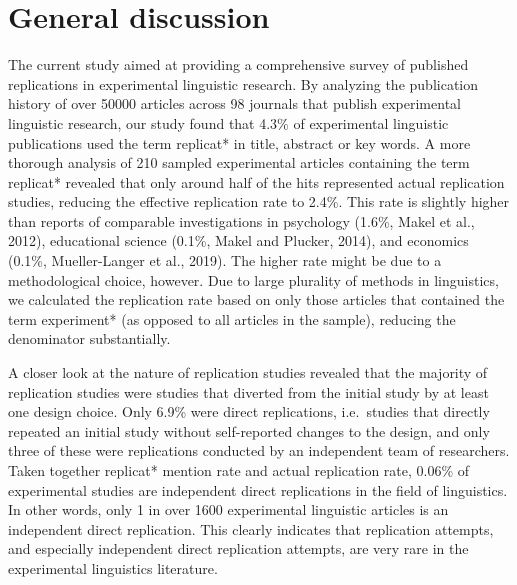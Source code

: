 \documentclass[]{elsarticle} %
\begin{document}
\hypertarget{general-discussion}{%
\section{General discussion}\label{general-discussion}}

The current study aimed at providing a comprehensive survey of published replications in experimental linguistic research.
By analyzing the publication history of over 50000 articles across 98 journals that publish experimental linguistic research, our study found that 4.3\% of experimental linguistic publications used the term replicat* in title, abstract or key words.
A more thorough analysis of 210 sampled experimental articles containing the term replicat* revealed that only around half of the hits represented actual replication studies, reducing the effective replication rate to 2.4\%. This rate is slightly higher than reports of comparable investigations in psychology (1.6\%, Makel et al., 2012), educational science (0.1\%, Makel and Plucker, 2014), and economics (0.1\%, Mueller-Langer et al., 2019). The higher rate might be due to a methodological choice, however. Due to large plurality of methods in linguistics, we calculated the replication rate based on only those articles that contained the term experiment* (as opposed to all articles in the sample), reducing the denominator substantially.

A closer look at the nature of replication studies revealed that the majority of replication studies were studies that diverted from the initial study by at least one design choice. Only 6.9\% were direct replications, i.e.~studies that directly repeated an initial study without self-reported changes to the design, and only three of these were replications conducted by an independent team of researchers.
Taken together replicat* mention rate and actual replication rate, 0.06\% of experimental studies are independent direct replications in the field of linguistics. In other words, only 1 in over 1600 experimental linguistic articles is an independent direct replication. This clearly indicates that replication attempts, and especially independent direct replication attempts, are very rare in the experimental linguistics literature.
\end{document}
